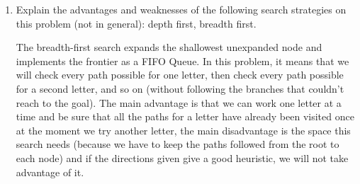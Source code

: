 \begin{enumerate}
    \item Explain the advantages and weaknesses of the following search
        strategies on this problem (not in general): depth first,
        breadth first.
        \begin{framed}
            The breadth-first search expands the shallowest unexpanded node
            and implements the frontier as a FIFO Queue. In this problem,
            it means that we will check every path possible for one letter,
            then check every path possible for a second letter, and so on
            (without following the branches that couldn't reach to the
            goal). The main advantage is that we can work one letter at a
            time and be sure that all the paths for a letter have already
            been visited once at the moment we try another letter, the main
            disadvantage is the space this search needs (because we have to
            keep the paths followed from the root to each node) and if the
            directions given give a good heuristic, we will not take
            advantage of it. \newline


\end{framed}
\end{enumerate}
